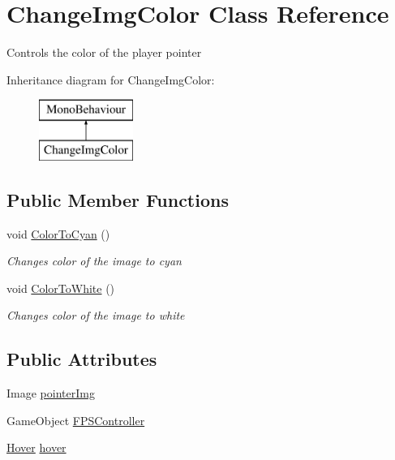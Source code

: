 \hypertarget{class_change_img_color}{}\section{Change\+Img\+Color Class Reference}
\label{class_change_img_color}


Controls the color of the player pointer  


Inheritance diagram for Change\+Img\+Color\+:\begin{figure}[H]
\begin{center}
\leavevmode
\includegraphics[height=2.000000cm]{class_change_img_color}
\end{center}
\end{figure}
\subsection*{Public Member Functions}
\begin{DoxyCompactItemize}
\item 
void \hyperlink{class_change_img_color_acd55e75f01e427cf37a94adf1db0caba}{Color\+To\+Cyan} ()
\begin{DoxyCompactList}\small\item\em Changes color of the image to cyan \end{DoxyCompactList}\item 
void \hyperlink{class_change_img_color_a29115dac8ba47323e3c21019416e2175}{Color\+To\+White} ()
\begin{DoxyCompactList}\small\item\em Changes color of the image to white \end{DoxyCompactList}\end{DoxyCompactItemize}
\subsection*{Public Attributes}
\begin{DoxyCompactItemize}
\item 
Image \hyperlink{class_change_img_color_a7036b7621e8c305bbc226dcd9b59527b}{pointer\+Img}
\item 
Game\+Object \hyperlink{class_change_img_color_af0934ecd3c6b6e3b6a098748f4cff84e}{F\+P\+S\+Controller}
\item 
\hyperlink{class_hover}{Hover} \hyperlink{class_change_img_color_a8624af46aaa3a3a668a55137cc67bd06}{hover}
\end{DoxyCompactItemize}


